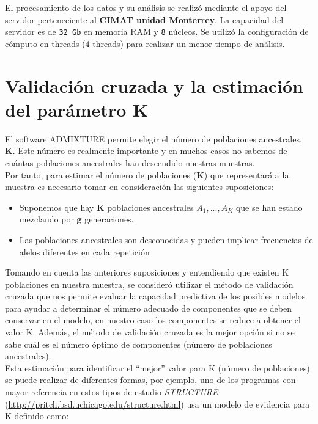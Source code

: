 El procesamiento de los datos y su an\'alisis se realiz\'o mediante el apoyo del servidor perteneciente al \textbf{CIMAT unidad Monterrey}. La capacidad del servidor es de \texttt{32 Gb} en memoria RAM y \texttt{8} n\'ucleos. Se utiliz\'o la configuraci\'on de c\'omputo en threads (4 threads) para realizar un menor tiempo de an\'alisis.


\section{Validaci\'on cruzada y la estimaci\'on del par\'ametro K}

El software ADMIXTURE permite elegir el n\'umero de poblaciones ancestrales, \textbf{K}. Este n\'umero es realmente importante y en muchos casos no sabemos de cu\'antas poblaciones ancestrales han descendido nuestras muestras.\\

Por tanto, para estimar el n\'umero de poblaciones (\textbf{K}) que representar\'a a la muestra es necesario tomar en consideraci\'on las siguientes suposiciones:

\begin{itemize}
\item Suponemos que hay \textbf{K} poblaciones ancestrales $A_{1},...,A_{K}$ que se han estado mezclando por \textbf{g} generaciones.
\item Las poblaciones ancestrales son desconocidas y pueden implicar frecuencias de alelos diferentes en cada repetici\'on
\end{itemize}

Tomando en cuenta las anteriores suposiciones y entendiendo que existen K poblaciones en nuestra muestra, se consider\'o utilizar el m\'etodo de validaci\'on cruzada que nos permite evaluar la capacidad predictiva de los posibles modelos para ayudar a determinar el n\'umero adecuado de componentes que se deben conservar en el modelo, en nuestro caso los componentes se reduce a obtener el valor K. Adem\'as, el m\'etodo de validaci\'on cruzada es la mejor opci\'on si no se sabe cu\'al es el n\'umero \'optimo de componentes (n\'umero de poblaciones ancestrales).\\

Esta estimaci\'on para identificar el ``mejor'' valor para K (n\'umero de poblaciones) se puede realizar de diferentes formas, por ejemplo, uno de los programas con mayor referencia en estos tipos de estudio \textit{STRUCTURE} (\url{http://pritch.bsd.uchicago.edu/structure.html}) usa un modelo de evidencia para K definido como:

